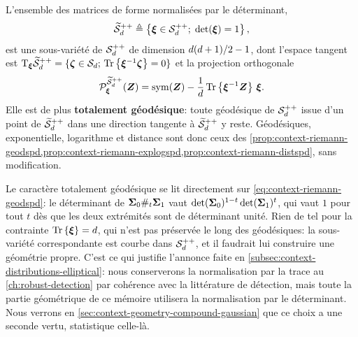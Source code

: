 \begin{property}
\label{prop:context-riemann-detun}
  L'ensemble des matrices de forme normalisées par le déterminant,
  \begin{equation}
    \widetilde{\mathcal{S}}_{d}^{++}
    \triangleq
    \left\{ \boldsymbol{\xi}\in\mathcal{S}_{d}^{++};\; \operatorname{\operatorname{det}}(\boldsymbol{\xi})=1 \right\},
    \label{eq:context-riemann-spddet}
  \end{equation}
  est une sous-variété de $\mathcal{S}_{d}^{++}$ de dimension $d(d+1)/2-1$, dont l'espace tangent est $\mathrm{T}_{\boldsymbol{\xi}}\widetilde{\mathcal{S}}_{d}^{++}=\{\boldsymbol{\zeta}\in\mathcal{S}_{d};\,\operatorname{\operatorname{Tr}}\left\{{\boldsymbol{\xi}}^{-1}\boldsymbol{\zeta}\right\}=0\}$ et la projection orthogonale
  \begin{equation}
    \mathcal{P}_{\boldsymbol{\xi}}^{\widetilde{\mathcal{S}}_{d}^{++}}(\boldsymbol{Z})
    =
    \operatorname{\operatorname{sym}}(\boldsymbol{Z}) - \frac{1}{d}\operatorname{\operatorname{Tr}}\left\{{\boldsymbol{\xi}}^{-1}\boldsymbol{Z}\right\}\,\boldsymbol{\xi}.
    \label{eq:context-riemann-projdet}
  \end{equation}
  Elle est de plus \textbf{totalement géodésique}: toute géodésique de $\mathcal{S}_{d}^{++}$ issue d'un point de $\widetilde{\mathcal{S}}_{d}^{++}$ dans une direction tangente à $\widetilde{\mathcal{S}}_{d}^{++}$ y reste. Géodésiques, exponentielle, logarithme et distance sont donc ceux des \cref{prop:context-riemann-geodspd,prop:context-riemann-explogspd,prop:context-riemann-distspd}, sans modification.
\end{property}

\begin{remark}
\label{rem:context-riemann-normalisation}
  Le caractère totalement géodésique se lit directement sur \cref{eq:context-riemann-geodspd}: le déterminant de $\boldsymbol{\Sigma}_0\#_t\boldsymbol{\Sigma}_1$ vaut $\operatorname{\operatorname{det}}(\boldsymbol{\Sigma}_0)^{1-t}\operatorname{\operatorname{det}}(\boldsymbol{\Sigma}_1)^{t}$, qui vaut $1$ pour tout $t$ dès que les deux extrémités sont de déterminant unité. Rien de tel pour la contrainte $\operatorname{\operatorname{Tr}}\left\{\boldsymbol{\xi}\right\}=d$, qui n'est pas préservée le long des géodésiques: la sous-variété correspondante est courbe dans $\mathcal{S}_{d}^{++}$, et il faudrait lui construire une géométrie propre. C'est ce qui justifie l'annonce faite en \cref{subsec:context-distributions-elliptical}: nous conserverons la normalisation par la trace au \cref{ch:robust-detection} par cohérence avec la littérature de détection, mais toute la partie géométrique de ce mémoire utilisera la normalisation par le déterminant. Nous verrons en \cref{sec:context-geometry-compound-gaussian} que ce choix a une seconde vertu, statistique celle-là.
\end{remark}

